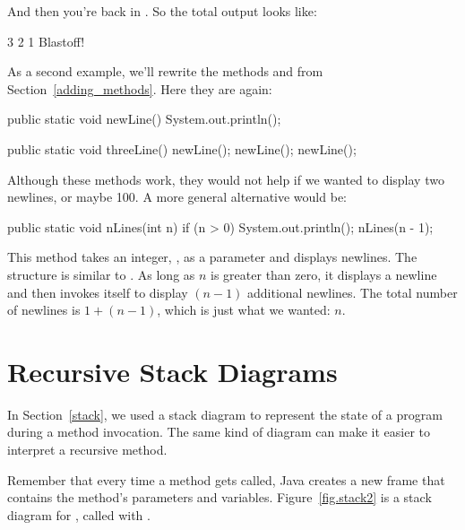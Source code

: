 And then you're back in .
So the total output looks like:

\begin{stdout}
3
2
1
Blastoff!
\end{stdout}

As a second example, we'll rewrite the methods  and  from Section~\ref{adding_methods}.
Here they are again:

\begin{code}
public static void newLine() {
    System.out.println();
}

public static void threeLine() {
    newLine();
    newLine();
    newLine();
}
\end{code}


Although these methods work, they would not help if we wanted to display two newlines, or maybe 100.
A more general alternative would be:

\begin{code}
public static void nLines(int n) {
    if (n > 0) {
        System.out.println();
        nLines(n - 1);
    }
}
\end{code}

This method takes an integer, , as a parameter and displays  newlines.
The structure is similar to .
As long as $n$ is greater than zero, it displays a newline and then invokes itself to display $(n-1)$ additional newlines.
The total number of newlines is $1 + (n - 1)$, which is just what we wanted: $n$.


\section{Recursive Stack Diagrams}


In Section~\ref{stack}, we used a stack diagram to represent the state of a program during a method invocation.
The same kind of diagram can make it easier to interpret a recursive method.

Remember that every time a method gets called, Java creates a new frame that contains the method's parameters and variables.
Figure~\ref{fig.stack2} is a stack diagram for , called with .

